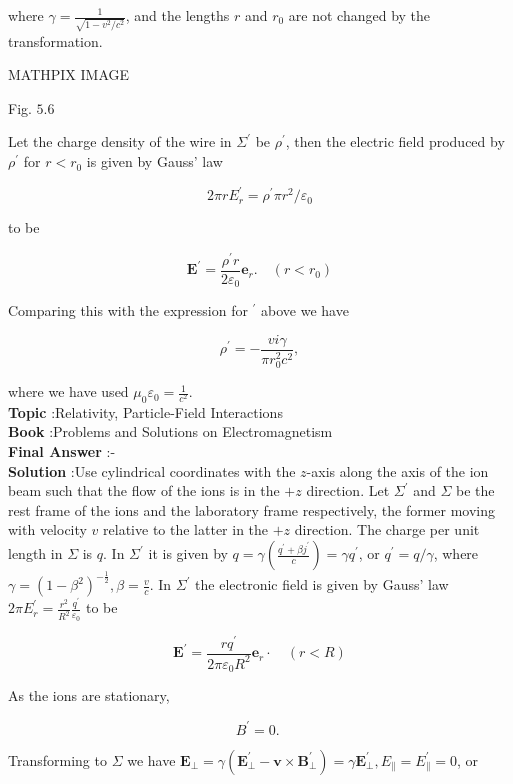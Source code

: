 \documentclass[10pt]{article}
\begin{document}
where $\gamma=\frac{1}{\sqrt{1-v^{2} / c^{2}}}$, and the lengths $r$ and $r_{0}$ are not changed by the transformation.

MATHPIX IMAGE

Fig. $5.6$

 Let the charge density of the wire in $\Sigma^{\prime}$ be $\rho^{\prime}$, then the electric field produced by $\rho^{\prime}$ for $r<r_{0}$ is given by Gauss' law

$$
2 \pi r E_{r}^{\prime}=\rho^{\prime} \pi r^{2} / \varepsilon_{0}
$$

to be

$$
\mathbf{E}^{\prime}=\frac{\rho^{\prime} r}{2 \varepsilon_{0}} \mathbf{e}_{r} . \quad\left(r<r_{0}\right)
$$

Comparing this with the expression for $\mathbb{}^{\prime}$ above we have

$$
\rho^{\prime}=-\frac{v i \gamma}{\pi r_{0}^{2} c^{2}},
$$

where we have used $\mu_{0} \varepsilon_{0}=\frac{1}{c^{2}}$.
\\
\textbf{Topic} :Relativity, Particle-Field Interactions\\
\textbf{Book} :Problems and Solutions on Electromagnetism\\
\textbf{Final Answer} :-\\


\textbf{Solution} :Use cylindrical coordinates with the $z$-axis along the axis of the ion beam such that the flow of the ions is in the $+z$ direction. Let $\Sigma^{\prime}$ and $\Sigma$ be the rest frame of the ions and the laboratory frame respectively, the former moving with velocity $v$ relative to the latter in the $+z$ direction. The charge per unit length in $\Sigma$ is $q$. In $\Sigma^{\prime}$ it is given by $q=\gamma\left(\frac{q^{\prime}+\beta j^{\prime}}{c}\right)=\gamma q^{\prime}$, or $q^{\prime}=q / \gamma$, where $\gamma=\left(1-\beta^{2}\right)^{-\frac{1}{2}}, \beta=\frac{v}{c}$. In $\Sigma^{\prime}$ the electronic field is given by Gauss' law $2 \pi E_{r}^{\prime}=\frac{r^{2}}{R^{2}} \frac{q^{\prime}}{\varepsilon_{0}}$ to be

$$
\mathbf{E}^{\prime}=\frac{r q^{\prime}}{2 \pi \varepsilon_{0} R^{2}} \mathbf{e}_{r} \cdot \quad(r<R)
$$

As the ions are stationary,

$$
B^{\prime}=0 \text {. }
$$

Transforming to $\Sigma$ we have $\mathbf{E}_{\perp}=\gamma\left(\mathbf{E}_{\perp}^{\prime}-\mathbf{v} \times \mathbf{B}_{\perp}^{\prime}\right)=\gamma \mathbf{E}_{\perp}^{\prime}, E_{\|}=E_{\|}^{\prime}=0$, or
\end{document}
